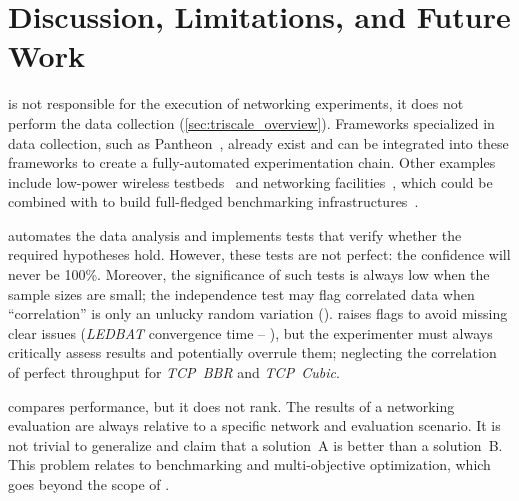 \section{Discussion, Limitations, and Future Work}
\label{sec:going_further}

\triscale is not responsible for the execution of networking experiments, \ie it does not perform the data collection (\cref{sec:triscale_overview}).
Frameworks specialized in data collection, such as Pantheon~\cite{yan18pantheon}, already exist and \triscale can be integrated into these frameworks to create a fully-automated experimentation chain.
Other examples include low-power wireless testbeds~\cite{schuss2017Competition, schuss2018DCube, lim2013FlockLab} and networking facilities~\cite{banerjee2015PhantomNet, duplyakin19cloudlab, nussbaum17testbeds}, which could be combined with \triscale to build full-fledged benchmarking infrastructures~\cite{boano2018IoTBench}.


\triscale automates the data analysis and implements tests that verify whether the required hypotheses hold.
However, these tests are not perfect: the confidence will never be 100\%. Moreover, the significance of such tests is always low when the sample sizes are small; \eg the independence test may flag correlated data when ``correlation'' is only an unlucky random variation ().
\triscale raises flags to avoid missing clear issues (\eg \textit{LEDBAT} convergence time -- ), but the experimenter must always critically assess \triscale results and potentially overrule them; \eg neglecting the correlation of perfect throughput for \emph{TCP~BBR} and \emph{TCP~Cubic}.

\triscale compares performance, but it does not rank. The results of a networking evaluation are always relative to a specific network and evaluation scenario.
It is not trivial to generalize and claim that a solution~A is better than a solution~B. This problem relates to benchmarking and multi-objective optimization, which goes beyond the scope of \triscale.

